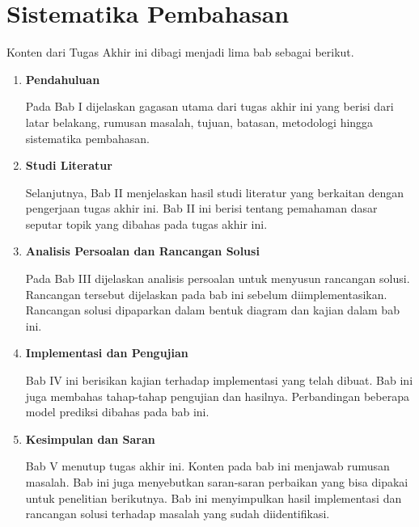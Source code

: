 \section{Sistematika Pembahasan}

Konten dari Tugas Akhir ini  dibagi menjadi lima bab sebagai berikut.
\begin{enumerate}
    \item \textbf{Pendahuluan}

    Pada Bab I  dijelaskan gagasan utama dari tugas akhir ini yang berisi dari latar belakang, rumusan masalah, tujuan, batasan, metodologi hingga sistematika pembahasan.

    \item \textbf{Studi Literatur}

    Selanjutnya, Bab II  menjelaskan hasil studi literatur yang berkaitan dengan pengerjaan tugas akhir ini. Bab II ini berisi tentang pemahaman dasar seputar topik yang  dibahas pada tugas akhir ini.

    \item \textbf{Analisis Persoalan dan Rancangan Solusi}

    Pada Bab III  dijelaskan analisis persoalan untuk menyusun rancangan solusi. Rancangan tersebut  dijelaskan pada bab ini sebelum diimplementasikan. Rancangan solusi  dipaparkan dalam bentuk diagram dan kajian dalam bab ini.

    \item \textbf{Implementasi dan Pengujian}

    Bab IV ini  berisikan kajian terhadap implementasi yang telah dibuat. Bab ini juga  membahas tahap-tahap pengujian dan hasilnya. Perbandingan beberapa model prediksi  dibahas pada bab ini.

    \item \textbf{Kesimpulan dan Saran}

    Bab V  menutup tugas akhir ini. Konten pada bab ini  menjawab rumusan masalah. Bab ini juga  menyebutkan saran-saran perbaikan yang bisa dipakai untuk penelitian berikutnya. Bab ini  menyimpulkan hasil implementasi dan rancangan solusi terhadap masalah yang sudah diidentifikasi.
\end{enumerate}
